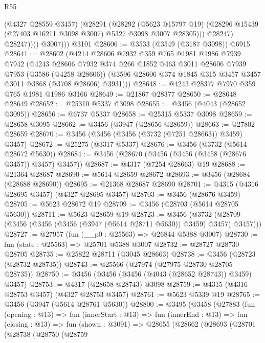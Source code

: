 \begin{lexlean}{R55}
\begin{coremodule}
                  (@4327 @28559 @3457)
                  (@28291
                    (@28292
                      (@5623 @15797 @19)
                      (@28296 @15439 (@27403 @16211 @3098 @3007) @5327 @3098 @3007 @28305)))
                  @28247)
                @28247))))
          @3007)))
    @3101
@28606 := @3533 (@3549 (@3187 @3098)) @6915
@28641 := @28602
    (@4214
      @28606
      @7932
      @359
      @765
      @1981
      @1986
      @7939
      @7942
      (@4243
        @28606
        @7932
        @374
        @266
        @1852
        @463
        @3011
        @28606
        @7939
        @7953
        (@3586 (@4258 @28606))
        (@3596 @28606 @374 @1845 @315 @3457 @3457 @3011 @3868 (@3708 @28606) @3931)))
@28648 := @4243 @28377 @7970 @359 @765 @1981 @1986 @3166
@28649 := @21867 @28377
@28650 := @28648 @28649
@28652 := @25310 @5337 @3098
@28655 := @3456 (@4043 (@28652 @3095))
@28656 := @6737 @5337
@28658 := @25315 @5337 @3098
@28659 := @28658 @3095
@28662 := @3456 (@3947 (@28656 @28659))
@28663 := @27802 @28659
@28670 := @3456 (@3456 (@3456 (@3732 (@7251 @28663)) @3459) @3457)
@28672 := @25275 (@3317 @5337)
@28676 := @3456 (@3732 (@5614 @28672 @5630))
@28684 := @3456 (@28670 (@3456 (@3456 (@3458 (@28676 @3457)) @3457) @3457))
@28687 := @4317 (@7254 @28663) @19
@28688 := @21364 @28687
@28690 := @5614 @28659 @28672
@28693 := @3456 (@28684 (@28688 @28690))
@28695 := @21368 @28687 @28690
@28701 := @4315 (@4316 @28695 @3457) (@4327 @28695 @3457)
@28703 := @3456 (@28676 @3459)
@28705 := @5623 @28672 @19
@28709 := @3456 (@28703 (@5614 @28705 @5630))
@28711 := @5623 @28659 @19
@28723 := @3456
    (@3732 (@28709 (@3456 (@3456 (@3456 (@3947 (@5614 @28711 @5630)) @3459) @3457) @3457)))
@28727 := @27957 (fun (__p0 : @25563) => @26844 @5388 @3007)
@28730 := fun (state : @25563) => @25701 @5388 @3007
@28732 := @28727 @28730 @28705
@28735 := @25822 @28711 (@3045 @28663)
@28738 := @3456 (@28723 (@28732 @28735))
@28743 := @25566 (@27974 (@27975 @28730 @28705 @28735))
@28750 := @3456 (@3456 (@3456 (@4043 (@28652 @28743)) @3459) @3457)
@28753 := @4317 (@28658 @28743) @3098
@28759 := @4315 (@4316 @28753 @3457) (@4327 @28753 @3457)
@28761 := @5623 @5339 @19
@28765 := @3456 (@3947 (@5614 @28761 @5630))
@28800 := @3495
    (@3458
      (@27883
        (fun (opening : @13) =>
        fun (innerStart : @13) =>
        fun (innerEnd : @13) =>
        fun (closing : @13) =>
        fun (shown : @3091) =>
        @28655
          (@28662
            (@28693
              (@28701
                (@28738
                  (@28750
                    (@28759

\end{coremodule}
\end{lexlean}

